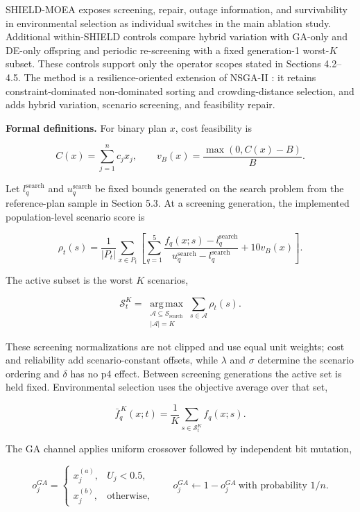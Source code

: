 \documentclass[energies,article,submit,moreauthors]{Definitions/mdpi}
\begin{document}
SHIELD-MOEA exposes screening, repair, outage information, and survivability in environmental selection as individual switches in the main ablation study. Additional within-SHIELD controls compare hybrid variation with GA-only and DE-only offspring and periodic re-screening with a fixed generation-1 worst-\(K\) subset. These controls support only the operator scopes stated in Sections 4.2--4.5. The method is a resilience-oriented extension of NSGA-II \cite{ref30}: it retains constraint-dominated non-dominated sorting and crowding-distance selection, and adds hybrid variation, scenario screening, and feasibility repair.

\textbf{Formal definitions.} For binary plan \(x\), cost feasibility is

\[
C(x)=\sum_{j=1}^{n}c_jx_j,\qquad v_B(x)=\frac{\max(0,C(x)-B)}{B}.
\]

Let \(l_q^{\mathrm{search}}\) and \(u_q^{\mathrm{search}}\) be fixed bounds generated on the search problem from the reference-plan sample in Section 5.3. At a screening generation, the implemented population-level scenario score is

\[
\rho_t(s)=\frac{1}{|P_t|}\sum_{x\in P_t}\left[
\sum_{q=1}^{5}\frac{f_q(x;s)-l_q^{\mathrm{search}}}
{u_q^{\mathrm{search}}-l_q^{\mathrm{search}}}+10v_B(x)\right].
\]

The active subset is the worst \(K\) scenarios,

\[
\mathcal S_t^{K}=\operatorname*{arg\,max}_{\substack{\mathcal A\subseteq\mathcal S_{\mathrm{search}}\\|\mathcal A|=K}}
\sum_{s\in\mathcal A}\rho_t(s).
\]

These screening normalizations are not clipped and use equal unit weights; cost and reliability add scenario-constant offsets, while \(\lambda\) and \(\sigma\) determine the scenario ordering and \(\delta\) has no p4 effect. Between screening generations the active set is held fixed. Environmental selection uses the objective average over that set,

\[
\bar f_q^{\,K}(x;t)=\frac{1}{K}\sum_{s\in\mathcal S_t^K}f_q(x;s).
\]

The GA channel applies uniform crossover followed by independent bit mutation,

\[
o_j^{GA}=\begin{cases}x_j^{(a)},&U_j<0.5,\\x_j^{(b)},&\text{otherwise},\end{cases}
\qquad
o_j^{GA}\leftarrow1-o_j^{GA}\ \text{with probability }1/n .
\]
\end{document}
